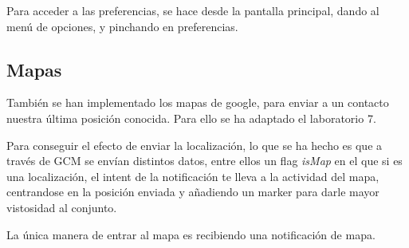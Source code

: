 \documentclass[]{article}
\begin{document}
Para acceder a las preferencias, se hace desde la pantalla principal, dando al men\'u de opciones, y pinchando en preferencias.

\subsection{Mapas}
Tambi\'en se han implementado los mapas de google, para enviar a un contacto nuestra \'ultima posici\'on conocida. Para ello se ha
adaptado el laboratorio 7. 

Para conseguir el efecto de enviar la localizaci\'on, lo que se ha hecho es que a trav\'es de GCM
se env\'ian distintos datos, entre ellos un flag \emph{isMap} en el que si es una localizaci\'on, el intent de la 
notificaci\'on te lleva a la actividad del mapa, centrandose en la posici\'on enviada y a\~nadiendo un marker para darle
mayor vistosidad al conjunto. 

La \'unica manera de entrar al mapa es recibiendo una notificaci\'on de mapa.
\end{document}

